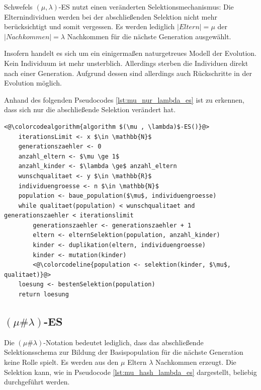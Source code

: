 Schwefels $(\mu, \lambda)$-ES nutzt einen veränderten Selektionsmechanismus:
Die Elternindividuen werden bei der abschließenden Selektion nicht mehr berücksichtigt und somit vergessen. Es werden lediglich $|Eltern| = \mu$ der $|Nachkommen| = \lambda$ Nachkommen für die nächste Generation ausgewählt.

Insofern handelt es sich um ein einigermaßen naturgetreues Modell der Evolution. Kein Individuum ist mehr unsterblich. Allerdings sterben die Individuen direkt nach einer Generation. Aufgrund dessen sind allerdings auch Rückschritte in der Evolution möglich.

Anhand des folgenden Pseudocodes \ref{lst:mu_nur_lambda_es} ist zu erkennen, dass sich nur die abschließende Selektion verändert hat.

\begin{lstlisting}[caption={$(\mu, \lambda)$-Evolutionsstrategie}, firstnumber=1, captionpos=b, label=lst:mu_nur_lambda_es]
<@\colorcodealgorithm{algorithm $(\mu , \lambda)$-ES()}@>
	iterationsLimit <- x $\in \mathbb{N}$
	generationszaehler <- 0
	anzahl_eltern <- $\mu \ge 1$
	anzahl_kinder <- $\lambda \ge$ anzahl_eltern
	wunschqualitaet <- y $\in \mathbb{R}$
	individuengroesse <- n $\in \mathbb{N}$
	population <- baue_population($\mu$, individuengroesse)
	while qualitaet(population) < wunschqualitaet and generationszaehler < iterationslimit
		generationszaehler <- generationszaehler + 1
		eltern <- elternSelektion(population, anzahl_kinder)
		kinder <- duplikation(eltern, individuengroesse)
		kinder <- mutation(kinder)
		<@\colorcodeline{population <- selektion(kinder, $\mu$, qualitaet)}@>
	loesung <- bestenSelektion(population)
	return loesung
\end{lstlisting}

\subsection{$(\mu \# \lambda)$-ES}

Die $(\mu \# \lambda)$-Notation bedeutet lediglich, dass das abschließende Selektionsschema zur Bildung der Basispopulation für die nächste Generation keine Rolle spielt.
Es werden aus den $\mu$ Eltern $\lambda$ Nachkommen erzeugt. Die Selektion kann, wie in Pseudocode \ref{lst:mu_hash_lambda_es} dargestellt, beliebig durchgeführt werden.

